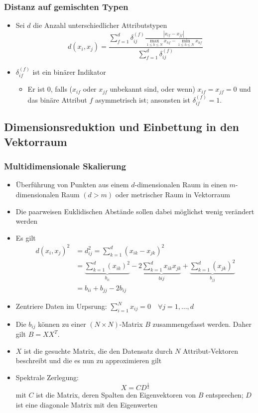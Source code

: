 \documentclass{scrartcl}
\begin{document}
\subsubsection{Distanz auf gemischten Typen}

\begin{itemize}
	\item Sei $ d $ die Anzahl unterschiedlicher Attributstypen
	\[ d(x_i,x_j) = \frac{\sum_{f=1}^{d} \delta_{ij}^{(f)} \frac{|x_{if} - 
	x_{jf}|}{\max_{1 \leq h \leq N} x_{hf} - \min_{1 \leq h \leq N} 
	x_{hf}}}{\sum_{f=1}^{d} \delta_{ij}^{(f)}} \]
	\item $ \delta_{if}^{(f)} $ ist ein binärer Indikator
	\begin{itemize}
		\item Er ist 0, falls ($ x_{if} $ oder $ x_{jf} $ unbekannt sind, oder 
		wenn) $ x_{if} = x_{jf} = 0 $ und das binäre Attribut $ f $ 
		asymmetrisch ist; ansonsten ist $ \delta_{if}^{(f)} = 1 $.
	\end{itemize}
\end{itemize}

\subsection{Dimensionsreduktion und Einbettung in den Vektorraum}

\subsubsection{Multidimensionale Skalierung}

\begin{itemize}
	\item Überführung von Punkten aus einem $ d $-dimensionalen Raum in einen $ 
	m $-dimensionalen Raum $ (d > m) $ oder metrischer Raum in Vektorraum
	\item Die paarweisen Euklidischen Abstände sollen dabei möglichst wenig 
	verändert werden
	\item Es gilt
	\begin{align*}
		d(x_i,x_j)^2 &= d_{ij}^2 = \sum_{k=1}^{d} (x_{ik} - x_{jk})^2 \\
		&= \underbrace{\sum_{k=1}^{d} (x_{ik})^2}_{b_{ii}} - 2 
		\underbrace{\sum_{k=1}^{d} x_{ik} x_{jk}}_{b{ij}} + 
		\underbrace{\sum_{k=1}^{d} (x_{jk})^2}_{b_{jj}} \\
		&= b_{ii} + b_{jj} - 2b_{ij}
	\end{align*}
	\item Zentriere Daten im Urpsrung: $ \sum_{i=1}^{N} x_{ij} = 0 \quad 
	\forall j = 1,\ldots,d $
	\item Die $ b_{ij} $ können zu einer $ (N \times N) $-Matrix $ B $ 
	zusammengefasst werden. Daher gilt $ B=XX^T $.
	\item $ X $ ist die gesuchte Matrix, die den Datensatz durch $ N $ 
	Attribut-Vektoren beschreibt und die es nun zu approximieren gilt
	\item Spektrale Zerlegung:
	\[ X = CD^{\frac{1}{2}} \]
	mit $ C $ ist die Matrix, deren Spalten den Eigenvektoren von $ B $ 
	entsprechen; $ D $ ist eine diagonale Matrix mit den Eigenwerten
\end{itemize}
\end{document}
